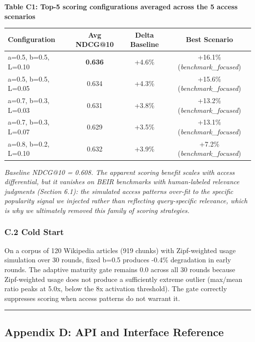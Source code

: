 \documentclass[
  11pt]{article}
\newcounter{none} %
\begin{document}
\textbf{Table C1: Top-5 scoring configurations averaged across the 5 access scenarios}

{\def\LTcaptype{none} %
\begin{longtable}[]{@{}lccc@{}}
\toprule\noalign{}
Configuration & Avg NDCG@10 & Delta Baseline & Best Scenario \\
\midrule\noalign{}
\endhead
\bottomrule\noalign{}
\endlastfoot
a=0.5, b=0.5, L=0.10 & \textbf{0.636} & +4.6\% & +16.1\% (\emph{benchmark\_focused}) \\
a=0.5, b=0.5, L=0.05 & 0.634 & +4.3\% & +15.6\% (\emph{benchmark\_focused}) \\
a=0.7, b=0.3, L=0.03 & 0.631 & +3.8\% & +13.2\% (\emph{benchmark\_focused}) \\
a=0.7, b=0.3, L=0.07 & 0.629 & +3.5\% & +13.1\% (\emph{benchmark\_focused}) \\
a=0.8, b=0.2, L=0.10 & 0.632 & +3.9\% & +7.2\% (\emph{benchmark\_focused}) \\
\end{longtable}
}

\emph{Baseline NDCG@10 = 0.608. The apparent scoring benefit scales with access differential, but it vanishes on BEIR benchmarks with human-labeled relevance judgments (Section 6.1): the simulated access patterns over-fit to the specific popularity signal we injected rather than reflecting query-specific relevance, which is why we ultimately removed this family of scoring strategies.}

\subsubsection{C.2 Cold Start}\label{c.2-cold-start}

On a corpus of 120 Wikipedia articles (919 chunks) with Zipf-weighted usage simulation over 30 rounds, fixed b=0.5 produces -0.4\% degradation in early rounds. The adaptive maturity gate remains 0.0 across all 30 rounds because Zipf-weighted usage does not produce a sufficiently extreme outlier (max/mean ratio peaks at 5.0x, below the 8x activation threshold). The gate correctly suppresses scoring when access patterns do not warrant it.

\begin{center}\rule{0.5\linewidth}{0.5pt}\end{center}

\subsection{Appendix D: API and Interface Reference}\label{appendix-d-api-and-interface-reference}
\end{document}
